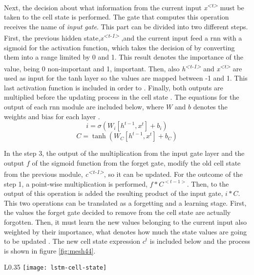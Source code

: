 	Next, the decision about what information from the current input \textit{x\textsuperscript{<t>}} must be taken to the cell state is performed. The gate that computes this operation receives the name of \textit{input gate}. This part can be divided into two different steps. First, the previous hidden state,\textit{x\textsuperscript{<t-1>}} ,and the current input feed a \acrshort{rnn} with a sigmoid for the activation function, which takes the decision of  by converting them into a range limited by 0 and 1. This result denotes the importance of the value, being 0 non-important and 1, important. Then, also \textit{h\textsuperscript{<t-1>}} and \textit{x\textsuperscript{<t>}} are used as input for the \acrshort{tanh} layer so the values are mapped between -1 and 1. This last activation function is included in order to . Finally, both outputs are multiplied before the updating process in the cell state \cite{Nguyen2018}. The equations for the output of each \acrshort{rnn} module are included below, where $W$ and $b$ denotes the weights and bias for each layer \cite{Olah2015}.
	\[ i = \sigma(W_{i}[h^{t-1}, x^{t}] + b_{i}) \]
	\[ C = \tanh(W_{C}[h^{t-1}, x^{t}] + b_{C}) \]
	
	In the step 3, the output of the multiplication from the input gate layer and the output $f$ of the sigmoid function from the forget gate, modify the old cell state from the previous module, \textit{c\textsuperscript{<t-1>}}, so it can be updated. For the outcome of the step 1, a point-wise multiplication is performed, $f * C^{<t-1>}$. Then, to the output of this operation is added the resulting product of the input gate, $i * C$. This two operations can be translated as a forgetting and a learning stage. First, the values the forget gate decided to remove from the cell state are actually forgotten. Then, it must learn the new values belonging to the current input also weighted by their importance, what denotes how much the state values are going to be updated \cite{Olah2015}. The new cell state expression $c^{t}$ is included below and the process is shown in figure \ref{fig:mesh44}.
	
	\begin{wrapfigure}[3]{L}{0.35\textwidth}
		\centering
		\captionsetup{justification=centering}
		\texttt{[image: lstm-cell-state]}
		\caption{Cell state}
		\label{fig:mesh44}
	\end{wrapfigure}
	
